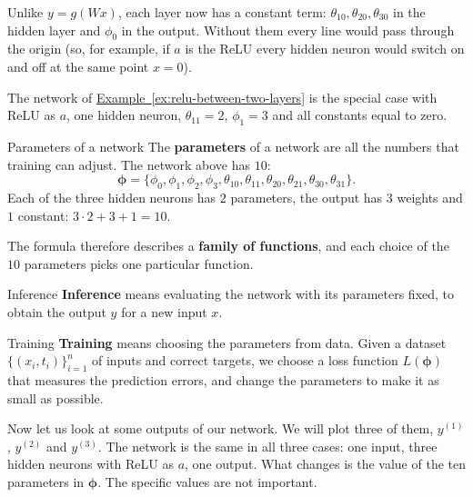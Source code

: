 \documentclass[a4paper,12pt,oneside]{report}
\begin{document}
Unlike $y=g(Wx)$, each layer now has a constant term:
$\theta_{10},\theta_{20},\theta_{30}$ in the hidden layer and
$\phi_0$ in the output. Without them every line would pass through
the origin (so, for example, if $a$ is the ReLU every hidden neuron
would switch on and off at the same point $x=0$).

The network of
\hyperref[ex:relu-between-two-layers]{Example~\ref*{ex:relu-between-two-layers}}
is the special case with ReLU as $a$, one hidden neuron,
$\theta_{11}=2$, $\phi_1=3$ and all constants equal to zero.

\begin{frameddefn}{Parameters of a network}\label{def:network-parameters}
The \textbf{parameters} of a network are all the numbers that training
can adjust. The network above has $10$:
\[
  \boldsymbol{\phi}=\{\phi_0,\phi_1,\phi_2,\phi_3,
    \theta_{10},\theta_{11},\theta_{20},\theta_{21},
    \theta_{30},\theta_{31}\}.
\]
Each of the three hidden neurons has $2$ parameters, the output has
$3$ weights and $1$ constant: $3\cdot 2+3+1=10$.
\end{frameddefn}

The formula therefore describes a \textbf{family of functions}, and
each choice of the $10$ parameters picks one particular function.

\begin{frameddefn}{Inference}\label{def:inference}
\textbf{Inference} means evaluating the network with its parameters
fixed, to obtain the output $y$ for a new input $x$.
\end{frameddefn}

\begin{frameddefn}{Training}\label{def:training}
\textbf{Training} means choosing the parameters from data. Given a
dataset $\{(x_i,t_i)\}_{i=1}^{n}$ of inputs and correct targets, we
choose a loss function $L(\boldsymbol{\phi})$ that measures the
prediction errors, and change the parameters to make it as small as
possible.
\end{frameddefn}

Now let us look at some outputs of our network. We will plot three of
them, $y^{(1)}$, $y^{(2)}$ and $y^{(3)}$. The network is the same in all
three cases: one input, three hidden neurons with ReLU as $a$, one
output. What changes is the value of the ten parameters in
$\boldsymbol\phi$. The specific values are not important.
\end{document}
